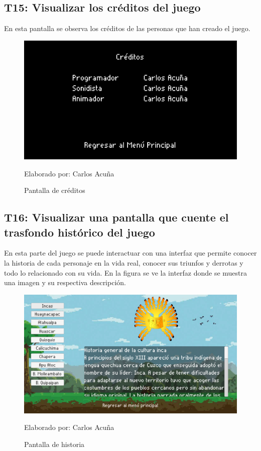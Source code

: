 \documentclass[a4paper, openright, 12pt]{report}
\begin{document}
\subsection*{T15: Visualizar los créditos del juego}
\justify
En esta pantalla se observa los créditos de las personas que han creado el juego.

\begin{figure}[h]
\captionsetup{justification=centering,margin=2cm}
\includegraphics[scale=0.5]{T15_01}
\centering
\caption{Pantalla de créditos}
Elaborado por: Carlos Acuña
\label{fig:T15_01}
\end{figure}

\subsection*{T16: Visualizar una pantalla que cuente el trasfondo histórico del juego}
\justify
En esta parte del juego se puede interactuar con una interfaz que permite conocer la historia de cada personaje en la vida real, conocer sus triunfos y derrotas y todo lo relacionado con su vida. En la figura se ve la interfaz donde se muestra una imagen y su respectiva descripción.

\begin{figure}[h]
\captionsetup{justification=centering,margin=2cm}
\includegraphics[scale=0.5]{T16_01}
\centering
\caption{Pantalla de historia}
Elaborado por: Carlos Acuña
\label{fig:T16_01}
\end{figure}
\end{document}
